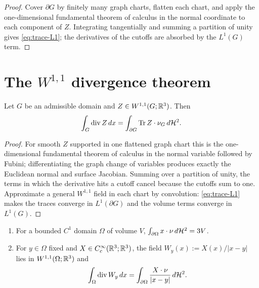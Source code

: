 \begin{proof}
Cover $\partial G$ by finitely many graph charts, flatten each chart, and
apply the one-dimensional fundamental theorem of calculus in the normal
coordinate to each component of $Z$.  Integrating tangentially and summing a
partition of unity gives \eqref{eq:trace-L1}; the derivatives of the cutoffs
are absorbed by the $L^1(G)$ term.
\end{proof}

\section{The $W^{1,1}$ divergence theorem}\label{sec:classical-calculus}

\begin{theorem}\label{thm:W11-gauss-green}
Let $G$ be an admissible domain and $Z\in W^{1,1}(G;\mathbb R^3)$.  Then
\begin{equation}\label{eq:W11-GG}
  \int_G\operatorname{div} Z\,dx=\int_{\partial G}\operatorname{Tr} Z\cdot\nu_G\,d\mathcal H^2 .
\end{equation}
\end{theorem}

\begin{proof}
For smooth $Z$ supported in one flattened graph chart this is the
one-dimensional fundamental theorem of calculus in the normal variable
followed by Fubini; differentiating the graph change of variables produces
exactly the Euclidean normal and surface Jacobian.  Summing over a partition
of unity, the terms in which the derivative hits a cutoff cancel because the
cutoffs sum to one.  Approximate a general $W^{1,1}$ field in each chart by
convolution: \eqref{eq:trace-L1} makes the traces converge in
$L^1(\partial G)$ and the volume terms converge in $L^1(G)$.
\end{proof}

\begin{corollary}
\label{cor:W11-GG-uses}
\begin{enumerate}[label=(\roman*)]
\item\label{it:W11-3V} For a bounded $C^1$ domain $\Omega$ of volume $V$,
  $\int_{\partial\Omega}x\cdot\nu\,d\mathcal H^2=3V$.
\item\label{it:W11-kernel} For $y\in\Omega$ fixed and
  $X\in C^\infty_c(\mathbb R^3;\mathbb R^3)$, the field $W_y(x):=X(x)/|x-y|$ lies in
  $W^{1,1}(\Omega;\mathbb R^3)$ and
  \begin{equation}\label{eq:W11-GG-application}
    \int_\Omega\operatorname{div} W_y\,dx
    =\int_{\partial\Omega}\frac{X\cdot\nu}{|x-y|}\,d\mathcal H^2 .
  \end{equation}
\end{enumerate}
\end{corollary}

